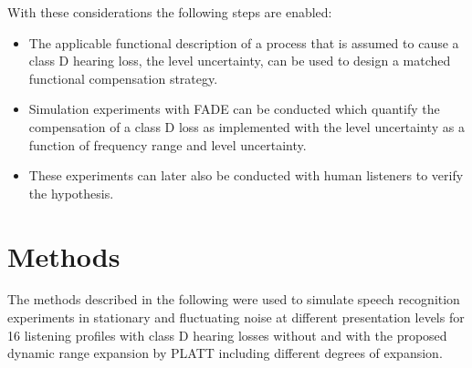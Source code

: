 \documentclass[10pt,a4paper,twocolumn]{article}
\begin{document}
With these considerations the following steps are enabled:
%
\begin{itemize}
	\item The applicable functional description of a process that is assumed to cause a class D hearing loss, the level uncertainty, can be used to design a matched functional compensation strategy.
	\item Simulation experiments with FADE can be conducted which quantify the compensation of a class D loss as implemented with the level uncertainty as a function of frequency range and level uncertainty.
	\item These experiments can later also be conducted with human listeners to verify the hypothesis.
\end{itemize}


\section*{Methods}
\label{sec:methods}
The methods described in the following were used to simulate speech recognition experiments in stationary and fluctuating noise at different presentation levels for 16 listening profiles with class D hearing losses without and with the proposed dynamic range expansion by PLATT including different degrees of expansion.
\end{document}
